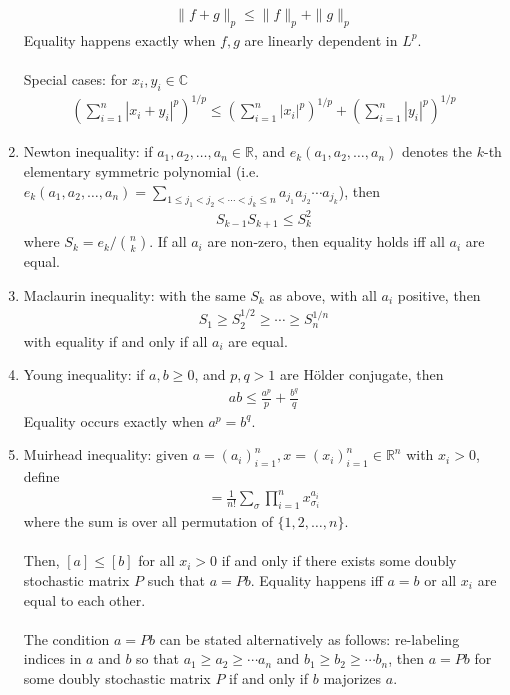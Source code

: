 \documentclass{treatise}
\begin{document}
\begin{shaded}
\begin{theorem}[Inequalities]
\begin{enumerate}
\begin{align*}
	\| f + g \|_p \leq \| f \|_p + \| g \|_p
	\end{align*}
	Equality happens exactly when $f, g$ are linearly dependent in $L^p$.
	\\
	\\
	Special cases: for $x_i, y_i \in \mathbb{C}$
	\begin{align*}
	\left( \sum_{i = 1}^n |x_i + y_i|^p \right)^{1/p} \leq \left( \sum_{i = 1}^n |x_i|^p \right)^{1/p} + \left( \sum_{i = 1}^n |y_i|^p \right)^{1/p}
	\end{align*}
	\item Newton inequality: if $a_1, a_2, \hdots, a_n \in \mathbb{R}$, and $e_k(a_1, a_2, \hdots, a_n)$ denotes the $k$-th elementary symmetric polynomial (i.e. $e_k(a_1, a_2, \hdots, a_n) = \sum_{1 \leq j_1 < j_2 < \cdots < j_k \leq n} a_{j_1} a_{j_2} \cdots a_{j_k}$), then
	\begin{align*}
	S_{k - 1} S_{k + 1} \leq S_k^2
	\end{align*}
	where $S_k = e_k / {n \choose k}$. If all $a_i$ are non-zero, then equality holds iff all $a_i$ are equal.
	\item Maclaurin inequality: with the same $S_k$ as above, with all $a_i$ positive, then
	\begin{align*}
	S_1 \geq S_2^{1/2} \geq \cdots \geq S_n^{1/n}
	\end{align*}
	with equality if and only if all $a_i$ are equal.
	\item Young inequality: if $a, b \geq 0$, and $p, q > 1$ are Hölder conjugate, then
	\begin{align*}
	ab \leq \frac{a^p}{p} + \frac{b^q}{q}
	\end{align*}
	Equality occurs exactly when $a^p = b^q$.
	\item Muirhead inequality: given $a = (a_i)_{i = 1}^n, x = (x_i)_{i = 1}^n \in \mathbb{R}^n$ with $x_i > 0$, define
	\begin{align*}
		[a] = \frac{1}{n!} \sum_{\sigma} \prod_{i = 1}^n x_{\sigma_i}^{a_i}
	\end{align*}
	where the sum is over all permutation of $\{1, 2, \hdots, n \}$.
	\\
	\\
	Then, $[a] \leq [b]$ for all $x_i > 0$ if and only if there exists some doubly stochastic matrix $P$ such that $a = Pb$. Equality happens iff $a = b$ or all $x_i$ are equal to each other.
	\\
	\\
	The condition $a = Pb$ can be stated alternatively as follows: re-labeling indices in $a$ and $b$ so that $a_1 \geq a_2 \geq \cdots a_n$ and $b_1 \geq b_2 \geq \cdots b_n$, then $a = Pb$ for some doubly stochastic matrix $P$ if and only if $b$ majorizes $a$.

\end{enumerate}
\end{theorem}
\end{shaded}
\end{document}
